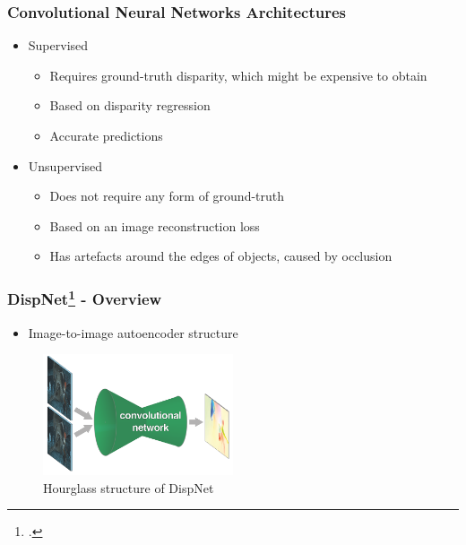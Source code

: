 \documentclass{beamer}
\begin{document}
\begin{frame}
\frametitle{Convolutional Neural Networks Architectures}
\center
\begin{itemize}
	\item Supervised
		\begin{itemize}
			\item Requires ground-truth disparity, which might be expensive to obtain
			\item Based on disparity regression
			\item Accurate predictions
		\end{itemize}
	\item Unsupervised
		\begin{itemize}
			\item Does not require any form of ground-truth
			\item Based on an image reconstruction loss
			\item Has artefacts around the edges of objects, caused by occlusion
		\end{itemize}
\end{itemize}
\end{frame}

\begin{frame}
\frametitle{DispNet\footcite{DBLP:journals/corr/MayerIHFCDB15} - Overview}
\center
\begin{itemize}
	\item Image-to-image autoencoder structure
\end{itemize}
\begin{figure}
    \centering
        \includegraphics[width=0.5\textwidth]{hourglass.png}
        \caption{Hourglass structure of DispNet}
    \end{figure}
\end{frame}
\end{document}
